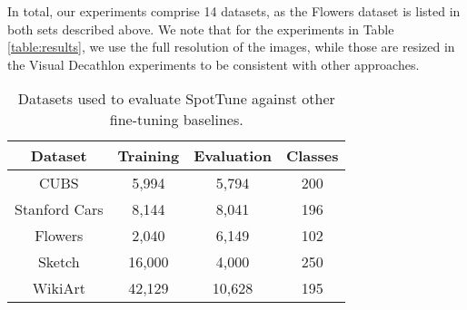 \documentclass[10pt,twocolumn,letterpaper]{article}
\begin{document}
In total, our experiments comprise 14 datasets, as the Flowers dataset is listed in both sets described above. We note that for the experiments in Table \ref{table:results}, we use the full resolution of the images, while those are resized in the Visual Decathlon experiments to be consistent with other approaches.\begin{center}
\begin{table}[t]
\center
\small
\begin{tabular}{ |c|c|c|c| } 
 \hline
 \textbf{Dataset} &  \textbf{Training} & \textbf{Evaluation} & \textbf{Classes} \\ 
\hline
CUBS & 5,994& 5,794&200 \\
\hline
Stanford Cars & 8,144& 8,041& 196\\
\hline
Flowers & 2,040 & 6,149& 102\\
\hline
Sketch & 16,000& 4,000& 250\\
\hline
WikiArt & 42,129& 10,628& 195\\
\hline
\end{tabular}
\caption{Datasets used to evaluate SpotTune against other fine-tuning baselines.}
\label{table: datasets}
\end{table}
\end{center}\def\arraystretch{1.1}%
	\small
\end{document}
